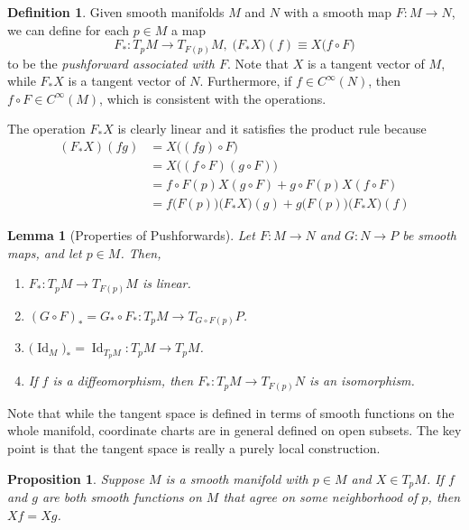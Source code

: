 \documentclass{article}
\DeclareMathOperator{\Id}{Id}
\newtheorem{proposition}[theorem]{Proposition}
\newtheorem{lemma}[theorem]{Lemma}
\theoremstyle{remark}
\theoremstyle{definition}
\newtheorem{definition}{Definition}[section]
\begin{document}
\begin{definition}
Given smooth manifolds $M$ and $N$ with a smooth map $F: M \longrightarrow N$, we can define for each $p \in M$ a map
\[F_*: T_p M \longrightarrow T_{F(p)} M, \; \big(F_* X \big) (f) \equiv X \big( f \circ F \big) \]
to be the \textit{pushforward associated with $F$}. Note that $X$ is a tangent vector of $M$, while $F_* X$ is a tangent vector of $N$. Furthermore, if $f \in C^\infty(N)$, then $f \circ F \in C^\infty (M)$, which is consistent with the operations. 

The operation $F_* X$ is clearly linear and it satisfies the product rule because
\begin{align*}
    (F_* X) (f g) & = X \big((fg) \circ F \big) \\
    & = X \big( (f \circ F) (g \circ F) \big) \\
    & = f \circ F(p) X(g \circ F) + g \circ F(p) X (f \circ F) \\
    & = f\big(F(p)\big) \big( F_* X \big) (g) + g \big( F(p)\big) \big( F_* X\big) (f)
\end{align*}

\begin{lemma}[Properties of Pushforwards]
Let $F: M \longrightarrow N$ and $G: N \longrightarrow P$ be smooth maps, and let $p \in M$. Then, 
\begin{enumerate}
    \item $F_*: T_p M \longrightarrow T_{F(p)} M$ is linear. 
    \item $(G \circ F)_* = G_* \circ F_* : T_p M \longrightarrow T_{G \circ F (p)} P$. 
    \item $\big( \Id_M \big)_* = \Id_{T_p M} : T_p M \longrightarrow T_p M$. 
    \item If $f$ is a diffeomorphism, then $F_*: T_p M \longrightarrow T_{F(p)} N$ is an isomorphism. 
\end{enumerate}
\end{lemma}
\end{definition}

Note that while the tangent space is defined in terms of smooth functions on the whole manifold, coordinate charts are in general defined on open subsets. The key point is that the tangent space is really a purely local construction. 

\begin{proposition}
Suppose $M$ is a smooth manifold with $p \in M$ and $X \in T_p M$. If $f$ and $g$ are both smooth functions on $M$ that agree on some neighborhood of $p$, then $X f = X g$. 
\end{proposition}
\end{document}

